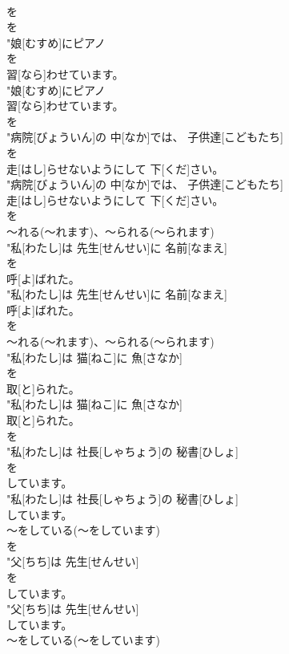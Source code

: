 \documentclass[8pt]{extreport}
\begin{document}
\begin{CJK}{UTF8}{min}
\\	を 
\\	を
\\	"娘[むすめ]にピアノ
\\	を
\\	習[なら]わせています。
\\	"娘[むすめ]にピアノ
\\	習[なら]わせています。
\\	を
\\	"病院[びょういん]の 中[なか]では、 子供達[こどもたち]
\\	を
\\	走[はし]らせないようにして 下[くだ]さい。
\\	"病院[びょういん]の 中[なか]では、 子供達[こどもたち]
\\	走[はし]らせないようにして 下[くだ]さい。
\\	を
\\	～れる(～れます)、～られる(～られます) 
\\	"私[わたし]は 先生[せんせい]に 名前[なまえ]
\\	を
\\	呼[よ]ばれた。
\\	"私[わたし]は 先生[せんせい]に 名前[なまえ]
\\	呼[よ]ばれた。
\\	を
\\	～れる(～れます)、～られる(～られます) 
\\	"私[わたし]は 猫[ねこ]に 魚[さなか]
\\	を
\\	取[と]られた。
\\	"私[わたし]は 猫[ねこ]に 魚[さなか]
\\	取[と]られた。
\\	を
\\	"私[わたし]は 社長[しゃちょう]の 秘書[ひしょ]
\\	を
\\	しています。
\\	"私[わたし]は 社長[しゃちょう]の 秘書[ひしょ]
\\	しています。
\\	～をしている(～をしています)	
\\	を
\\	"父[ちち]は 先生[せんせい]
\\	を
\\	しています。
\\	"父[ちち]は 先生[せんせい]
\\	しています。
\\	～をしている(～をしています)	

\end{CJK}
\end{document}
